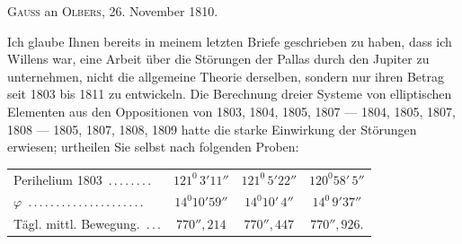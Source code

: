 \par\bigskip
{}
\begin{center}
\textsc{Gauss} an \textsc{Olbers}, 26. November 1810.
\end{center}
\noindent\hspace*{\parindent}Ich glaube Ihnen bereits in meinem letzten Briefe geschrieben zu haben, dass ich Willens war, eine Arbeit\HistoricalNoteEight{Vgl. S. 473 dieses Bandes.]} über die Störungen der Pallas durch den Jupiter zu unternehmen, nicht die allgemeine Theorie derselben, sondern nur ihren Betrag seit 1803 bis 1811 zu entwickeln. Die Berechnung dreier Systeme von elliptischen Elementen aus den Oppositionen von 1803, 1804, 1805, 1807 — 1804, 1805, 1807, 1808 — 1805, 1807, 1808, 1809 hatte die starke Einwirkung der Störungen erwiesen; urtheilen Sie selbst nach folgenden Proben:
\begin{center}
\begingroup\footnotesize\setlength{\tabcolsep}{3pt}\renewcommand{\arraystretch}{1.2}
\begin{tabular}{lccc}
Perihelium 1803\ .\,.\,.\,.\,.\,.\,.\,. & \(121^{0}\,3'11''\) & \(121^{0}\,5'22''\) & \(120^{0}58'\,5''\)\\
\(\varphi\)\ .\,.\,.\,.\,.\,.\,.\,.\,.\,.\,.\,.\,.\,.\,.\,.\,.\,.\,.\,.\,. & \(14^{0}10'59''\) & \(14^{0}10'\,4''\) & \(14^{0}\,9'37''\)\\
Tägl. mittl. Bewegung.\ .\,.\,. & \(770''{,}214\) & \(770''{,}447\) & \(770''{,}926.\)\\
\end{tabular}\endgroup
\end{center}
\par
